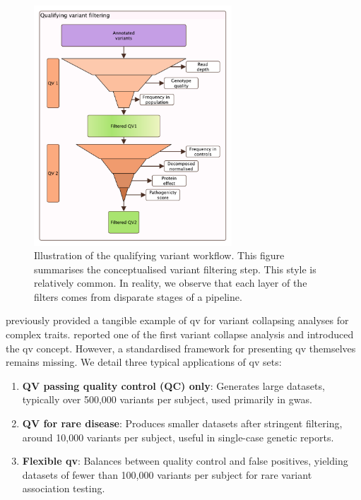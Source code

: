 \begin{figure}
\centering
     \includegraphics[width=0.66\textwidth]{./images/qv_filter_pyramid_vcurrent.pdf}
\caption{Illustration of the qualifying variant workflow. This figure summarises the conceptualised variant filtering step. This style is relatively common. In reality, we observe that each layer of the filters comes from disparate stages of a pipeline.}
    \label{fig:qv_filter_pyramid_vcurrent}
\end{figure}

\citet{povysil2019rare} previously provided a tangible example of \ac{qv} for variant collapsing analyses for complex traits. 
\citet{cirulli2015exome} reported one of the first variant collapse analysis and introduced the \ac{qv} concept.
However, a standardised framework for presenting \ac{qv} themselves remains missing. 
We detail three typical applications of \ac{qv} sets:

\begin{enumerate}
    \item \textbf{QV passing quality control (QC) only}: Generates large datasets, typically over 500,000 variants per subject, used primarily in \ac{gwas}.
    \item \textbf{QV for rare disease}: Produces smaller datasets after stringent filtering, around 10,000 variants per subject, useful in single-case genetic reports.
    \item \textbf{Flexible \ac{qv}}: Balances between quality control and false positives, yielding datasets of fewer than 100,000 variants per subject for rare variant association testing.
\end{enumerate}

